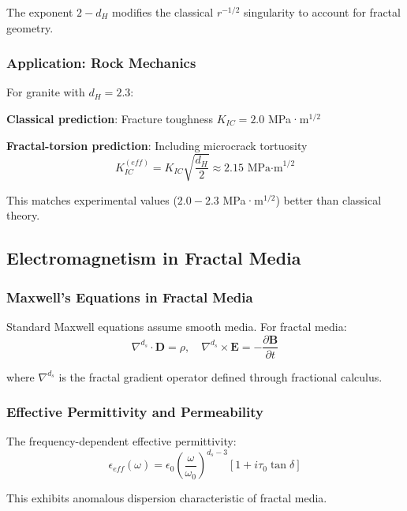 The exponent $2-d_H$ modifies the classical $r^{-1/2}$ singularity to account for fractal geometry.

\subsubsection{Application: Rock Mechanics}

For granite with $d_H = 2.3$:

\textbf{Classical prediction}: Fracture toughness $K_{IC} = 2.0$ MPa·m$^{1/2}$

\textbf{Fractal-torsion prediction}: Including microcrack tortuosity
\begin{equation}
    K_{IC}^{(eff)} = K_{IC} \sqrt{\frac{d_H}{2}} \approx 2.15 \text{ MPa·m}^{1/2}
\end{equation}

This matches experimental values ($2.0-2.3$ MPa·m$^{1/2}$) better than classical theory.

\subsection{Electromagnetism in Fractal Media}

\subsubsection{Maxwell's Equations in Fractal Media}

Standard Maxwell equations assume smooth media. For fractal media:
\begin{equation}
    \nabla^{d_s} \cdot \mathbf{D} = \rho, \quad \nabla^{d_s} \times \mathbf{E} = -\frac{\partial \mathbf{B}}{\partial t}
\end{equation}

where $\nabla^{d_s}$ is the fractal gradient operator defined through fractional calculus.

\subsubsection{Effective Permittivity and Permeability}

The frequency-dependent effective permittivity:
\begin{equation}
    \epsilon_{eff}(\omega) = \epsilon_0 \left(\frac{\omega}{\omega_0}\right)^{d_s-3} \left[1 + i \tau_0 \tan\delta\right]
\end{equation}

This exhibits anomalous dispersion characteristic of fractal media.

